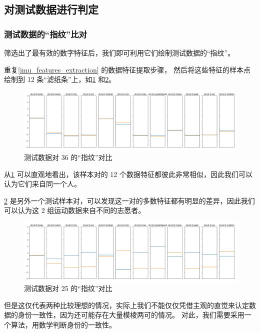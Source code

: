 \documentclass[withoutpreface]{cumcmthesis}
\begin{document}
\subsection{对测试数据进行判定}

\subsubsection{测试数据的“指纹”比对}

筛选出了最有效的数字特征后，我们即可利用它们绘制测试数据的“指纹”。

重复\cref{imu_features_extraction} 的数据特征提取步骤，
然后将这些特征的样本点绘制到 12 条“滤纸条”上，如\cref{fig:指纹比对-36} 和\cref{fig:指纹比对-25}。

\begin{figure}[!htbp]
    \centering
    \includegraphics[width=\textwidth]{figures/指纹比对-35.jpg}
    \caption{测试数据对 36 的“指纹”对比}
    \label{fig:指纹比对-36}
\end{figure}

从\cref{fig:指纹比对-36} 可以直观地看出，该样本对的 12 个数据特征都彼此非常相似，因此我们可以认为它们来自同一个人。

\cref{fig:指纹比对-25} 是另外一个测试样本对，可以发现这一对的多数特征都有明显的差异，因此我们可以认为这 2 组运动数据来自不同的志愿者。

\begin{figure}[!htbp]
    \centering
    \includegraphics[width=\textwidth]{figures/指纹比对-24.jpg}
    \caption{测试数据对 25 的“指纹”对比}
    \label{fig:指纹比对-25}
\end{figure}

但是这仅代表两种比较理想的情况，实际上我们不能仅仅凭借主观的直觉来认定数据的身份一致性，因为还可能存在大量模棱两可的情况。
对此，我们需要采用一个算法，用数学判断身份的一致性。
\end{document}

